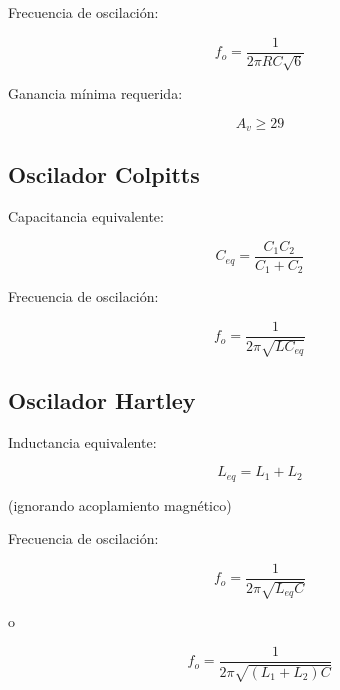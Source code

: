 \documentclass{article}
\begin{document}
Frecuencia de oscilación:

$$
f_o=
\frac{1}
{2\pi RC\sqrt{6}}
$$

Ganancia mínima requerida:

$$
A_v \ge 29
$$

\subsection{Oscilador Colpitts}

Capacitancia equivalente:

$$
C_{eq}=
\frac{C_1C_2}
{C_1+C_2}
$$

Frecuencia de oscilación:

$$
f_o=
\frac{1}
{2\pi\sqrt{LC_{eq}}}
$$

\subsection{Oscilador Hartley}

Inductancia equivalente:

$$
L_{eq}=L_1+L_2
$$

(ignorando acoplamiento magnético)

Frecuencia de oscilación:

$$
f_o=
\frac{1}
{2\pi\sqrt{L_{eq}C}}
$$

o

$$
f_o=
\frac{1}
{2\pi\sqrt{(L_1+L_2)C}}
$$
\end{document}
